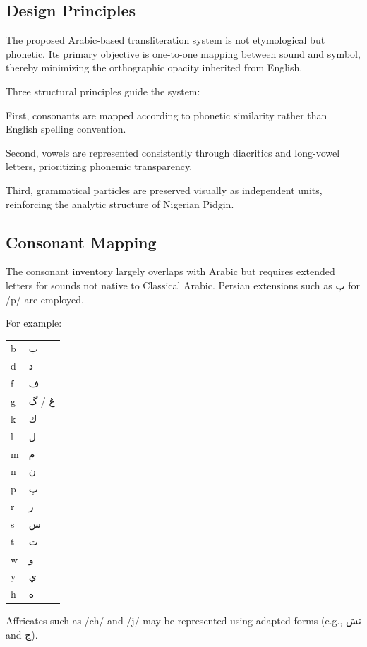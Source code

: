\documentclass[12pt]{article}
\begin{document}
\subsection{Design Principles}

The proposed Arabic-based transliteration system is not etymological but phonetic. Its primary objective is one-to-one mapping between sound and symbol, thereby minimizing the orthographic opacity inherited from English.

Three structural principles guide the system:

First, consonants are mapped according to phonetic similarity rather than English spelling convention.

Second, vowels are represented consistently through diacritics and long-vowel letters, prioritizing phonemic transparency.

Third, grammatical particles are preserved visually as independent units, reinforcing the analytic structure of Nigerian Pidgin.

\subsection{Consonant Mapping}

The consonant inventory largely overlaps with Arabic but requires extended letters for sounds not native to Classical Arabic. Persian extensions such as پ for /p/ are employed.

For example:

\begin{center}
\begin{tabular}{ll}
b & ب \\
d & د \\
f & ف \\
g & غ / گ \\
k & ك \\
l & ل \\
m & م \\
n & ن \\
p & پ \\
r & ر \\
s & س \\
t & ت \\
w & و \\
y & ي \\
h & ه \\
\end{tabular}
\end{center}

Affricates such as /ch/ and /j/ may be represented using adapted forms (e.g., تش and ج).
\end{document}
